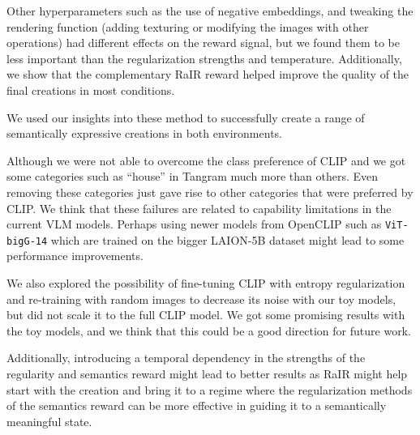 Other hyperparameters such as the use of negative embeddings, and tweaking the rendering function (adding texturing or modifying the images with other operations) had different effects on the reward signal, but we found them to be less important than the regularization strengths and temperature.
Additionally, we show that the complementary RaIR reward helped improve the quality of the final creations in most conditions.

We used our insights into these method to successfully create a range of semantically expressive creations in both environments.




Although we were not able to overcome the class preference of CLIP and we got some categories such as ``house'' in Tangram much more than others.
Even removing these categories just gave rise to other categories that were preferred by CLIP.
We think that these failures are related to capability limitations in the current VLM models.
Perhaps using newer models from OpenCLIP such as \texttt{ViT-bigG-14} \citep{openclip} which are trained on the bigger LAION-5B dataset \citep{laion5b} might lead to some performance improvements.

We also explored the possibility of fine-tuning CLIP with entropy regularization and re-training with random images to decrease its noise with our toy models, but did not scale it to the full CLIP model.
We got some promising results with the toy models, and we think that this could be a good direction for future work.

Additionally, introducing a temporal dependency in the strengths of the regularity and semantics reward might lead to better results as RaIR might help start with the creation and bring it to a regime where the regularization methods of the semantics reward can be more effective in guiding it to a semantically meaningful state.

